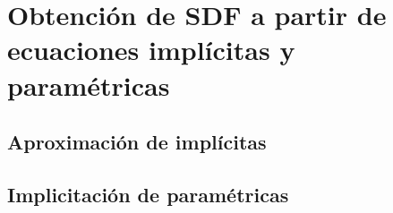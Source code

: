 
\chapter{Obtención de SDF a partir de ecuaciones implícitas y paramétricas}


\section{Aproximación de implícitas}


\section{Implicitación de paramétricas}
